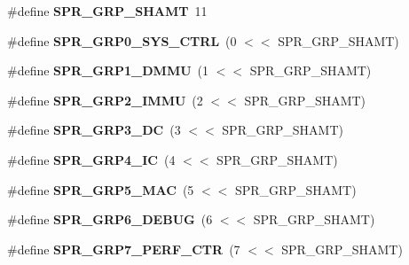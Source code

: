 \begin{DoxyCompactItemize}
\item 
\mbox{\label{or1k-utility_8h_a8d94b4b3373de2ce991d41a7fffa6195}} 
\#define {\bfseries S\+P\+R\+\_\+\+G\+R\+P\+\_\+\+S\+H\+A\+MT}~11
\item 
\mbox{\label{or1k-utility_8h_ad1422f2b29bdbb09a04051f96a27e20b}} 
\#define {\bfseries S\+P\+R\+\_\+\+G\+R\+P0\+\_\+\+S\+Y\+S\+\_\+\+C\+T\+RL}~(0  $<$$<$ S\+P\+R\+\_\+\+G\+R\+P\+\_\+\+S\+H\+A\+MT)
\item 
\mbox{\label{or1k-utility_8h_ab2ce6bea101b4cb45f627c8736d69197}} 
\#define {\bfseries S\+P\+R\+\_\+\+G\+R\+P1\+\_\+\+D\+M\+MU}~(1  $<$$<$ S\+P\+R\+\_\+\+G\+R\+P\+\_\+\+S\+H\+A\+MT)
\item 
\mbox{\label{or1k-utility_8h_a48c99754c5096c97d6795c6c99bc084b}} 
\#define {\bfseries S\+P\+R\+\_\+\+G\+R\+P2\+\_\+\+I\+M\+MU}~(2  $<$$<$ S\+P\+R\+\_\+\+G\+R\+P\+\_\+\+S\+H\+A\+MT)
\item 
\mbox{\label{or1k-utility_8h_a655c2c73e46dc7df9189985b416fb2ec}} 
\#define {\bfseries S\+P\+R\+\_\+\+G\+R\+P3\+\_\+\+DC}~(3  $<$$<$ S\+P\+R\+\_\+\+G\+R\+P\+\_\+\+S\+H\+A\+MT)
\item 
\mbox{\label{or1k-utility_8h_a1896f5c8519cb67aeda1972e645bec01}} 
\#define {\bfseries S\+P\+R\+\_\+\+G\+R\+P4\+\_\+\+IC}~(4  $<$$<$ S\+P\+R\+\_\+\+G\+R\+P\+\_\+\+S\+H\+A\+MT)
\item 
\mbox{\label{or1k-utility_8h_a9bfb46537e70008b7bee17637adadd9c}} 
\#define {\bfseries S\+P\+R\+\_\+\+G\+R\+P5\+\_\+\+M\+AC}~(5  $<$$<$ S\+P\+R\+\_\+\+G\+R\+P\+\_\+\+S\+H\+A\+MT)
\item 
\mbox{\label{or1k-utility_8h_a6996313f3fe019a4be41eabcaf442710}} 
\#define {\bfseries S\+P\+R\+\_\+\+G\+R\+P6\+\_\+\+D\+E\+B\+UG}~(6  $<$$<$ S\+P\+R\+\_\+\+G\+R\+P\+\_\+\+S\+H\+A\+MT)
\item 
\mbox{\label{or1k-utility_8h_ab642fae608987b0882120e083506feb5}} 
\#define {\bfseries S\+P\+R\+\_\+\+G\+R\+P7\+\_\+\+P\+E\+R\+F\+\_\+\+C\+TR}~(7  $<$$<$ S\+P\+R\+\_\+\+G\+R\+P\+\_\+\+S\+H\+A\+MT)

\end{DoxyCompactItemize}
